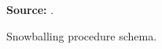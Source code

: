 \begin{figure}[ht!]
\centering

\caption{\textmd{Snowballing procedure schema.}}
\label{fig:snowballing-schema}

\par\medskip\ABNTEXfontereduzida\selectfont\textbf{Source:} .
\end{figure}